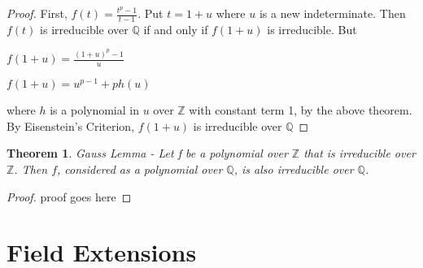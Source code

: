 \documentclass[12pt]{article}
\newtheorem{theorem}{Theorem}
\theoremstyle{definition}
\newcommand{\Z}{\mathbb Z}
\newcommand{\Q}{\mathbb Q}
\begin{document}
\begin{proof}
First, $f(t) = \frac{t^p - 1}{t - 1}$. Put $t = 1 + u$ where $u$ is a new indeterminate. Then $f(t)$ is irreducible over $\Q$ if and only if $f(1+u)$ is irreducible. But

$f(1+u) = \frac{(1+u)^p - 1}{u}$

$f(1+u) = u^{p-1} + ph(u)$

where $h$ is a polynomial in $u$ over $\Z$ with constant term 1, by the above theorem. By Eisenstein's Criterion, $f(1+u)$ is irreducible over $\Q$

\end{proof}

\begin{theorem}
    Gauss Lemma - Let f be a polynomial over $\Z$ that is irreducible over $\Z$. Then $f$, considered as a polynomial over $\Q$, is also irreducible over $\Q$.
\end{theorem}

\begin{proof}
    proof goes here
\end{proof}

\section{Field Extensions}
\end{document}
